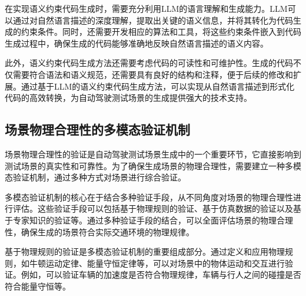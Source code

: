 	在实现语义约束代码生成时，需要充分利用LLM的语言理解和生成能力。LLM可以通过对自然语言描述的深度理解，提取出关键的语义信息，并将其转化为代码生成的约束条件。同时，还需要开发相应的算法和工具，将这些约束条件嵌入到代码生成过程中，确保生成的代码能够准确地反映自然语言描述的语义内容。
	
	此外，语义约束代码生成方法还需要考虑代码的可读性和可维护性。生成的代码不仅需要符合语法和语义规范，还需要具有良好的结构和注释，便于后续的修改和扩展。通过基于LLM的语义约束代码生成方法，可以实现从自然语言描述到形式化代码的高效转换，为自动驾驶测试场景的生成提供强大的技术支持。
	
	\subsection{场景物理合理性的多模态验证机制}
	场景物理合理性的验证是自动驾驶测试场景生成中的一个重要环节，它直接影响到测试场景的真实性和可靠性。为了确保生成场景的物理合理性，需要建立一种多模态验证机制，通过多种方式对场景进行综合验证。
	
	多模态验证机制的核心在于结合多种验证手段，从不同角度对场景的物理合理性进行评估。这些验证手段可以包括基于物理规则的验证、基于仿真数据的验证以及基于专家知识的验证等。通过多种验证手段的结合，可以全面评估场景的物理合理性，确保生成的场景符合实际交通环境的物理规律。
	
	基于物理规则的验证是多模态验证机制的重要组成部分。通过定义和应用物理规则，如牛顿运动定律、能量守恒定律等，可以对场景中的物体运动和交互进行验证。例如，可以验证车辆的加速度是否符合物理规律，车辆与行人之间的碰撞是否符合能量守恒等。

